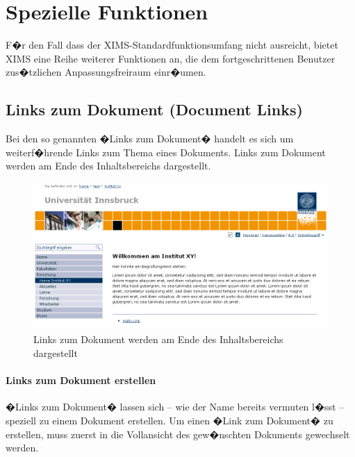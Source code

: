 \section{Spezielle Funktionen}
\label{specfeatures}

F�r den Fall dass der XIMS-Standardfunktionsumfang nicht ausreicht, bietet XIMS eine Reihe 
weiterer Funktionen an, die dem fortgeschrittenen Benutzer zus�tzlichen Anpassungsfreiraum einr�umen.

\subsection{Links zum Dokument (Document Links)}
\label{doclinks}

Bei den so genannten �Links zum Dokument� handelt es sich um weiterf�hrende
Links zum Thema eines Dokuments. Links zum Dokument werden am Ende des
Inhaltsbereichs dargestellt.

\begin{figure}[!ht]
	\centering
		\includegraphics[width=\textwidth]{./images/linkszumdokument.png}
	\caption{Links zum Dokument werden am Ende des Inhaltsbereichs dargestellt}
	\label{fig:dokumentlinks-live}
\end{figure}

\paragraph{Links zum Dokument erstellen}

�Links zum Dokument� lassen sich -- wie der Name bereits vermuten l�sst -- speziell
zu einem Dokument erstellen. Um einen �Link zum Dokument� zu erstellen, muss
zuerst in die Vollansicht des gew�nschten Dokuments gewechselt werden.

